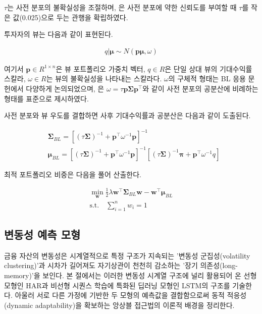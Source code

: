 \documentclass[eng]{kjas3}
\begin{document}
$\tau$는 사전 분포의 불확실성을 조절하며, \citet{helitterman1999}은 사전 분포에 약한 신뢰도를 부여할 때 $\tau$를 작은 값(0.025)으로 두는 관행을 확립하였다.

투자자의 뷰는 다음과 같이 표현된다.

\begin{align}\label{eq:bl_q}
    q|\boldsymbol{\mu} \sim N(\mathbf{p}\boldsymbol{\mu}, \omega)
\end{align}

여기서 $\mathbf{p} \in R^{1 \times n}$은 뷰 포트폴리오 가중치 벡터, $q \in R$은 단일 상대 뷰의 기대수익률 스칼라, $\omega\in R$는 뷰의 불확실성을 나타내는 스칼라다. $\omega$의 구체적 형태는 BL 응용 문헌에서 다양하게 논의되었으며, \citet{helitterman1999}은 $\omega = \tau\mathbf{p}\boldsymbol{\Sigma}\mathbf{p}^\top$와 같이 사전 분포의 공분산에 비례하는 형태를 표준으로 제시하였다.

사전 분포와 뷰 우도를 결합하면 사후 기대수익률과 공분산은 다음과 같이 도출된다.

\begin{align}\label{eq:bl_sigma_pos}
    & \boldsymbol{\Sigma}_{BL} = [(\tau\boldsymbol{\Sigma})^{-1} + \mathbf{p}^\top\omega^{-1}\mathbf{p}]^{-1}\\
    \label{eq:bl_mu_pos}
    & \boldsymbol{\mu}_{BL} = [(\tau\boldsymbol{\Sigma})^{-1} + \mathbf{p}^\top\omega^{-1}\mathbf{p}]^{-1}[(\tau\boldsymbol{\Sigma})^{-1}\boldsymbol{\pi}+\mathbf{p}^\top\omega^{-1}q]
\end{align}

최적 포트폴리오 비중은 다음을 풀어 산출한다.

\begin{align}\label{eq:bl_w}
    \min_{\mathbf{w}}\frac{1}{2}\lambda\mathbf{w}^\top\boldsymbol{\Sigma}_{BL}\mathbf{w}-\mathbf{w}^\top\boldsymbol{\mu}_{BL} \\
\text{s.t.} \quad \sum_{i=1}^{n}{w_i} = 1
\end{align}

\subsection{변동성 예측 모형}
\label{subsec:vol_pred_review}

금융 자산의 변동성은 시계열적으로 특정 구조가 지속되는 '변동성 군집성(volatility clustering)'과 시차가 길어져도 자기상관이 천천히 감소하는 '장기 의존성(long-memory)'을 보인다\citep{cont2001}. 본 절에서는 이러한 변동성 시계열 구조에 널리 활용되어 온 선형 모형인 HAR\citep{muller1997}과 비선형 시퀀스 학습에 특화된 딥러닝 모형인 LSTM\citep{hochreiter1997}의 구조를 기술한다. 아울러 서로 다른 가정에 기반한 두 모형의 예측값을 결합함으로써 동적 적응성(dynamic adaptability)을 확보하는 앙상블 접근법의 이론적 배경을 정리한다.
\end{document}
